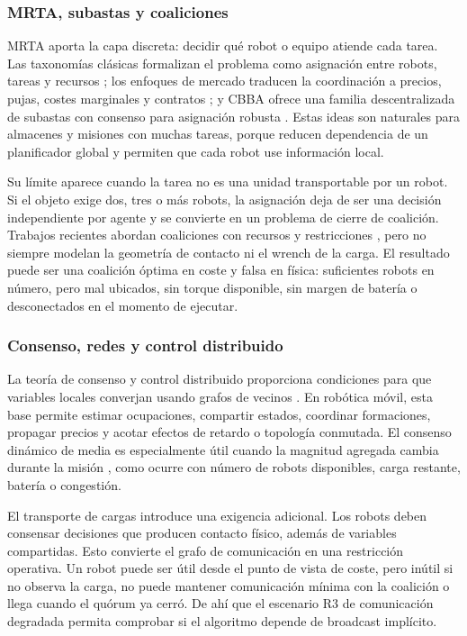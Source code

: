 

\subsubsection{MRTA, subastas y coaliciones}

MRTA aporta la capa discreta: decidir qué robot o equipo atiende cada tarea. Las
taxonomías clásicas formalizan el problema como asignación entre robots, tareas y
recursos \citep{gerkey2004formal,korsah2013taxonomy}; los enfoques de mercado traducen
la coordinación a precios, pujas, costes marginales y contratos
\citep{dias2006market}; y CBBA ofrece una familia descentralizada de subastas con
consenso para asignación robusta \citep{choi2009consensus}. Estas ideas son naturales
para almacenes y misiones con muchas tareas, porque reducen dependencia de un planificador
global y permiten que cada robot use información local.

Su límite aparece cuando la tarea no es una unidad transportable por un robot. Si el
objeto exige dos, tres o más robots, la asignación deja de ser una decisión independiente
por agente y se convierte en un problema de cierre de coalición. Trabajos recientes
abordan coaliciones con recursos y restricciones \citep{dutta2021hedonic,zhang2024coalition},
pero no siempre modelan la geometría de contacto ni el wrench de la carga. El resultado
puede ser una coalición óptima en coste y falsa en física: suficientes robots en número,
pero mal ubicados, sin torque disponible, sin margen de batería o desconectados en el
momento de ejecutar.

\subsubsection{Consenso, redes y control distribuido}

La teoría de consenso y control distribuido proporciona condiciones para que variables
locales converjan usando grafos de vecinos \citep{olfati2004consensus,olfati2007consensus,
ren2008distributed,bullo2009distributed}. En robótica móvil, esta base permite estimar
ocupaciones, compartir estados, coordinar formaciones, propagar precios y acotar efectos
de retardo o topología conmutada. El consenso dinámico de media es especialmente útil
cuando la magnitud agregada cambia durante la misión \citep{kia2019tutorial}, como ocurre
con número de robots disponibles, carga restante, batería o congestión.

El transporte de cargas introduce una exigencia adicional. Los robots deben consensar
decisiones que producen contacto físico, además de variables compartidas. Esto
convierte el grafo de comunicación en una restricción operativa. Un robot puede ser
útil desde el punto de vista de coste, pero inútil si no observa la carga, no puede
mantener comunicación mínima con la coalición o llega cuando el quórum ya cerró. De ahí
que el escenario R3 de comunicación degradada permita comprobar si el algoritmo depende
de broadcast implícito.

